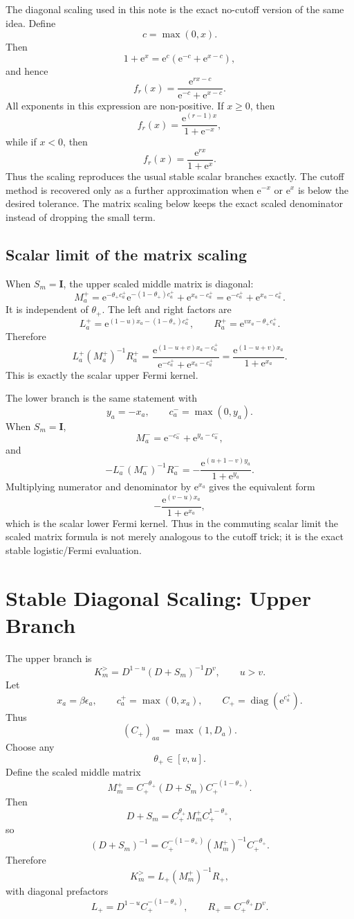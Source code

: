 \documentclass[11pt]{article}
\newcommand{\e}{\mathrm{e}}
\newcommand{\1}{\mathbb{1}}
\newcommand{\bI}{\mathbf{I}}
\newcommand{\diag}{\operatorname{diag}}
\newcommand{\br}[1]{\left(#1\right)}
\begin{document}
The diagonal scaling used in this note is the exact no-cutoff version of the
same idea.  Define
\[
    c=\max(0,x).
\]
Then
\[
    1+\e^x
    =
    \e^c\br{\e^{-c}+\e^{x-c}},
\]
and hence
\[
    f_r(x)
    =
    \frac{\e^{rx-c}}{\e^{-c}+\e^{x-c}}.
\]
All exponents in this expression are non-positive.  If \(x\ge0\), then
\[
    f_r(x)
    =
    \frac{\e^{(r-1)x}}{1+\e^{-x}},
\]
while if \(x<0\), then
\[
    f_r(x)
    =
    \frac{\e^{rx}}{1+\e^x}.
\]
Thus the scaling reproduces the usual stable scalar branches exactly.  The
cutoff method is recovered only as a further approximation when
\(\e^{-x}\) or \(\e^x\) is below the desired tolerance.  The matrix scaling
below keeps the exact scaled denominator instead of dropping the small term.

\subsection{Scalar limit of the matrix scaling}

When \(S_m=\bI\), the upper scaled middle matrix is diagonal:
\[
    M_a^+
    =
    \e^{-\theta_+c_a^+}\e^{-(1-\theta_+)c_a^+}
    +
    \e^{x_a-c_a^+}
    =
    \e^{-c_a^+}+\e^{x_a-c_a^+}.
\]
It is independent of \(\theta_+\).  The left and right factors are
\[
    L_a^+
    =
    \e^{(1-u)x_a-(1-\theta_+)c_a^+},
    \qquad
    R_a^+
    =
    \e^{vx_a-\theta_+c_a^+}.
\]
Therefore
\[
    L_a^+(M_a^+)^{-1}R_a^+
    =
    \frac{
    \e^{(1-u+v)x_a-c_a^+}
    }{
    \e^{-c_a^+}+\e^{x_a-c_a^+}
    }
    =
    \frac{\e^{(1-u+v)x_a}}{1+\e^{x_a}}.
\]
This is exactly the scalar upper Fermi kernel.

The lower branch is the same statement with
\[
    y_a=-x_a,
    \qquad
    c_a^-=\max(0,y_a).
\]
When \(S_m=\bI\),
\[
    M_a^-=\e^{-c_a^-}+\e^{y_a-c_a^-},
\]
and
\[
    -L_a^-(M_a^-)^{-1}R_a^-
    =
    -
    \frac{\e^{(u+1-v)y_a}}{1+\e^{y_a}}.
\]
Multiplying numerator and denominator by \(\e^{x_a}\) gives the equivalent
form
\[
    -
    \frac{\e^{(v-u)x_a}}{1+\e^{x_a}},
\]
which is the scalar lower Fermi kernel.  Thus in the commuting scalar limit
the scaled matrix formula is not merely analogous to the cutoff trick; it is
the exact stable logistic/Fermi evaluation.

\section{Stable Diagonal Scaling: Upper Branch}

The upper branch is
\[
    K_m^> = D^{1-u}(D+S_m)^{-1}D^v,
    \qquad
    u>v.
\]
Let
\[
    x_a=\beta\epsilon_a,
    \qquad
    c_a^+=\max(0,x_a),
    \qquad
    C_+ = \diag\br{\e^{c_a^+}}.
\]
Thus
\[
    (C_+)_{aa}=\max(1,D_a).
\]
Choose any
\[
    \theta_+\in[v,u].
\]
Define the scaled middle matrix
\[
    \boxed{
    M_m^+
    =
    C_+^{-\theta_+}
    \br{D+S_m}
    C_+^{-(1-\theta_+)}.
    }
\]
Then
\[
    D+S_m
    =
    C_+^{\theta_+} M_m^+ C_+^{1-\theta_+},
\]
so
\[
    (D+S_m)^{-1}
    =
    C_+^{-(1-\theta_+)}
    (M_m^+)^{-1}
    C_+^{-\theta_+}.
\]
Therefore
\[
    \boxed{
    K_m^>
    =
    L_+ (M_m^+)^{-1} R_+,
    }
\]
with diagonal prefactors
\[
    L_+
    =
    D^{1-u}C_+^{-(1-\theta_+)},
    \qquad
    R_+
    =
    C_+^{-\theta_+}D^v.
\]
\end{document}
